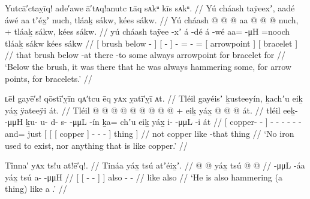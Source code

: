 \ex\label{ex:89-141-always-hammering}%
%
\begingl
	\glpreamble	Yutcā′ctaỵīq! ade′awe ā′tᴀq!anutc ʟāq sᴀkᵘ kīs sᴀkᵘ. //
	\glpreamble	Yú cháash taÿeexʼ, aadé áwé aa tʼéx̱ʼ nuch, tláaḵ sákw, kées sákw. //
	\gla	{} Yú cháash  @ {} {}
		{}  @ {} {}  @ {}
		aa @  @ {} @ \•nuch, +
		{} tláaḵ sákw, {}
		{} kées sákw. {} //
	\glb	{} yú cháash taÿee -xʼ {}
		{} á -dé {} á -wé
		aa=  -μH =nooch
		{} tláaḵ sákw {}
		{} kées sákw {} //
	\glc	{}[  brush below - {}]
		{}[  - {}]  -
		=  - =
		{}[ arrowpoint  {}]
		{}[ bracelet  {}] //
	\gld	{} that brush below -at {}
		{} there -to {}  {}
		some  {} \•always
		{} arrowpoint for {}
		{} bracelet for {} //
	\glft	‘Below the brush, it was there that he was always hammering some, for arrow points, for bracelets.’
		//
\endgl
\xe

\ex\label{ex:89-142-no-iron-no-copper}%
%
\begingl
	\glpreamble	ʟēł g̣ayē′s! qōstī′ỵīn qᴀʹtcu ēq yᴀx ỵatī′ỵī ᴀt. //
	\glpreamble	Tléil g̱ayéisʼ ḵusteeyín, ḵachʼu eiḵ yáx̱ ÿateeÿi át. //
	\gla	Tléil {}  @ {} @ {} {}
		 @ {} @ {} @ {} @ {} @ {} @ {} 
		 @ {} +
		{} {} {} eiḵ yáx̱ {}
			 @ {} @ {} @ {} {} át. {} //
	\glb	tléil {} eeḵ-  -μμH {}
		ḵu- u- d- s-  -μμL -ín
		ḵa= chʼu 
		{} {} {} eiḵ yáx̱ {}
			i-  -μμL -i {} át {} //
	\glc	{} {}[ copper-  - {}]
		- - - -  - -
		and= just
		{}[ {}[ {}[ copper  {}]
			-  - - {}] thing {}] //
	\gld	not {}  {} {} {}
		 {} {} {} {} {} {}
		 {}
		{} {} {} copper like {}
			 {} {} -that {} thing {} //
	\glft	‘No iron used to exist, nor anything that is like copper.’
		//
\endgl
\xe

\ex\label{ex:89-143-hammering-tinaa}%
%
\begingl
	\glpreamble	Tînna′ yᴀx ts!u at!ē′q!. //
	\glpreamble	Tináa yáx̱ tsú atʼéix̱ʼ. //
	\gla	{} {}  @ {} @ {} {} yáx̱ {} tsú
		 @ {} @ {} //
	\glb	{} {}  -μμL -áa {} yáx̱ {} tsú
		a-  -μμH //
	\glc	{}[ {}[  - - {}]  {}] also
		-  - //
	\gld	{} {}  {} {} {} like {} also
		 {} {} //
	\glft	‘He is also hammering (a thing) like a .’
		//
\endgl
\xe

